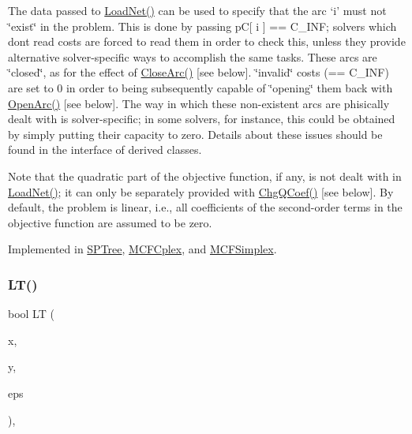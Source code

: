 The data passed to \mbox{\hyperlink{class_m_c_f_class_a8d82d26f7845eb69081c860e14c3dc4c}{Load\+Net()}} can be used to specify that the arc `i' must not \char`\"{}exist\char`\"{} in the problem. This is done by passing pC\mbox{[} i \mbox{]} == C\+\_\+\+I\+NF; solvers which don\textquotesingle{}t read costs are forced to read them in order to check this, unless they provide alternative solver-\/specific ways to accomplish the same tasks. These arcs are \char`\"{}closed\char`\"{}, as for the effect of \mbox{\hyperlink{class_m_c_f_class_ae1c33ba491b57343fbc157123fff5b11}{Close\+Arc()}} \mbox{[}see below\mbox{]}. \char`\"{}invalid\char`\"{} costs (== C\+\_\+\+I\+NF) are set to 0 in order to being subsequently capable of \char`\"{}opening\char`\"{} them back with \mbox{\hyperlink{class_m_c_f_class_ab902a23d1c9520a22b79de5d451c3348}{Open\+Arc()}} \mbox{[}see below\mbox{]}. The way in which these non-\/existent arcs are phisically dealt with is solver-\/specific; in some solvers, for instance, this could be obtained by simply putting their capacity to zero. Details about these issues should be found in the interface of derived classes.

Note that the quadratic part of the objective function, if any, is not dealt with in \mbox{\hyperlink{class_m_c_f_class_a8d82d26f7845eb69081c860e14c3dc4c}{Load\+Net()}}; it can only be separately provided with \mbox{\hyperlink{class_m_c_f_class_a4aa1d49c3edafbf4783d579d175070fd}{Chg\+Q\+Coef()}} \mbox{[}see below\mbox{]}. By default, the problem is linear, i.\+e., all coefficients of the second-\/order terms in the objective function are assumed to be zero. 

Implemented in \mbox{\hyperlink{class_s_p_tree_afbfa5c036f9ea67e35005ec77b82214a}{S\+P\+Tree}}, \mbox{\hyperlink{class_m_c_f_cplex_ac270d18d58fd6fe88164cde1f4c80aff}{M\+C\+F\+Cplex}}, and \mbox{\hyperlink{class_m_c_f_simplex_ac270d18d58fd6fe88164cde1f4c80aff}{M\+C\+F\+Simplex}}.

\mbox{\label{class_m_c_f_class_a7c0374fafa5efdfe1d78c22efaa9f9d6}} 
\subsubsection{\texorpdfstring{L\+T()}{LT()}}
{\footnotesize\ttfamily bool LT (\begin{DoxyParamCaption}\item[{T}]{x,  }\item[{T}]{y,  }\item[{const T}]{eps }\end{DoxyParamCaption})\hspace{0.3cm}{\ttfamily [inline]}, {\ttfamily [protected]}}

